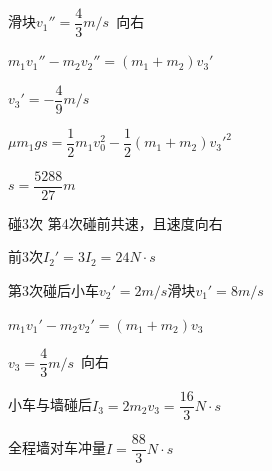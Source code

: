 \begin{problem}[21，15分]
\begin{solution}
滑块$v_1''=\dfrac{4}{3}\unit{m/s}$\ 向右

$m_1v_1''-m_2v_2''=(m_1+m_2)v_3'$

$v_3'=-\dfrac{4}{9}\unit{m/s}$

$\mu m_1gs=\dfrac{1}{2}m_1v_0^2-\dfrac{1}{2}(m_1+m_2)v_3'^2$

$s=\dfrac{5288}{27}\unit{m}$


碰3次 第4次碰前共速，且速度向右

前3次\quad $I_2'=3I_2=24\unit{N\cdot s}$

第3次碰后\quad 小车$v_2'=2\unit{m/s}$\quad 滑块$v_1'=8\unit{m/s}$

$m_1v_1'-m_2v_2'=(m_1+m_2)v_3$

$v_3=\dfrac{4}{3}\unit{m/s}$\ 向右

小车与墙碰后\quad $I_3=2m_2v_3=\dfrac{16}{3}\unit{N\cdot s}$

全程墙对车冲量\quad $I=\dfrac{88}{3}\unit{N\cdot s}$
\end{solution}
\end{problem}

